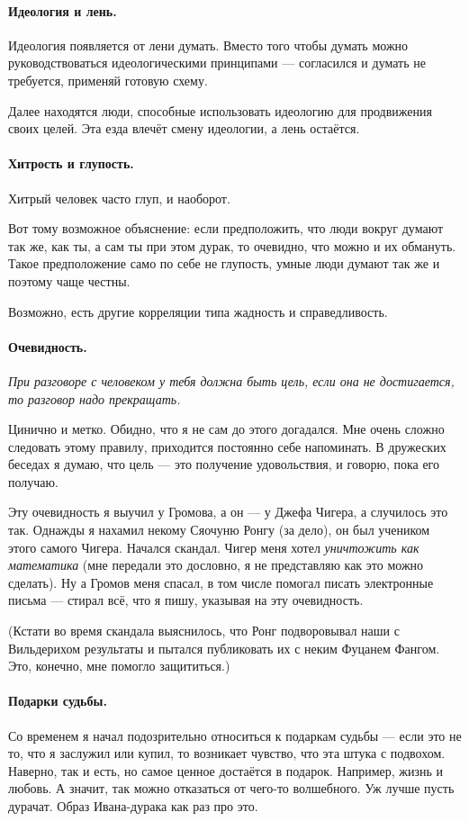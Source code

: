 \documentclass{book}
\begin{document}
\paragraph{Идеология и лень.}
Идеология появляется от лени думать.
Вместо того чтобы думать можно руководствоваться идеологическими принципами --- согласился и думать не требуется, применяй готовую схему.

Далее находятся люди, способные использовать идеологию для продвижения своих целей.
Эта езда влечёт смену идеологии, а лень остаётся.

\paragraph{Хитрость и глупость.}
Хитрый человек часто глуп, и наоборот.

Вот тому возможное объяснение:
если предположить, что люди вокруг думают так же, как ты, а сам ты при этом дурак, то очевидно, что можно и их обмануть.
Такое предположение само по себе не глупость, умные люди думают так же и поэтому чаще честны.

Возможно, есть другие корреляции типа жадность и справедливость.  

\paragraph{Очевидность.}
\textit{При разговоре с человеком у тебя должна быть цель, если она не достигается, то разговор надо прекращать.}

Цинично и метко.
Обидно, что я не сам до этого догадался.
Мне очень сложно следовать этому правилу, приходится постоянно себе напоминать.
В дружеских беседах я думаю, что цель --- это получение удовольствия, и говорю, пока его получаю.

Эту очевидность я выучил у Громова, а он --- у Джефа Чигера, а случилось это так.
Однажды я нахамил некому Сяочуню Ронгу (за дело), он был учеником этого самого Чигера.
Начался скандал.
Чигер меня хотел \textit{уничтожить как математика} (мне передали это дословно, я не представляю как это можно сделать).
Ну а Громов меня спасал, в том числе помогал писать электронные письма --- стирал всё, что я пишу, указывая на эту очевидность.

(Кстати во время скандала выяснилось, что Ронг подворовывал наши с Вильдерихом результаты и пытался публиковать их с неким Фуцанем Фангом.
Это, конечно, мне помогло защититься.)

\paragraph{Подарки судьбы.}
Со временем я начал подозрительно относиться к подаркам судьбы --- если это не то, что я заслужил или купил, то возникает чувство, что эта штука с подвохом.
Наверно, так и есть, но самое ценное достаётся в подарок.
Например, жизнь и любовь.
А значит, так можно отказаться от чего-то волшебного.
Уж лучше пусть дурачат.
Образ Ивана-дурака как раз про это.
\end{document}
